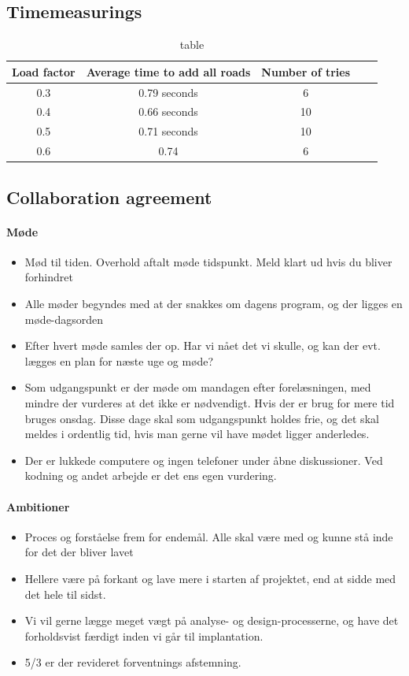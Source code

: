 \documentclass[a4paper,10pt,titlepage]{article}
\begin{document}
	\newpage

	\subsection{Timemeasurings}
		\begin{table}[H]
		\caption{table}
		\centering
		\begin{tabular}{c c c c c}
Load factor & Average time to add all roads & Number of tries \\ [1.5ex] 
\hline
0.3 & 0.79 seconds & 6\\
0.4 & 0.66 seconds & 10 \\
0.5 & 0.71 seconds & 10 \\
0.6 & 0.74 & 6
\end{tabular}
\end{table}

	\newpage
	\subsection{Collaboration agreement}

\paragraph{M\o de} 
\begin{itemize}
\item Mød til tiden. Overhold aftalt møde tidspunkt. Meld klart ud hvis du bliver forhindret
\item Alle møder begyndes med at der snakkes om dagens program, og der ligges en møde-dagsorden
\item Efter hvert møde samles der op. Har vi nået det vi skulle, og kan der evt. lægges en plan for næste uge og møde?
\item Som udgangspunkt er der møde om mandagen efter forelæsningen, med mindre der vurderes at det ikke er nødvendigt. Hvis der er brug for mere tid bruges onsdag. Disse dage skal som udgangspunkt holdes frie, og det skal meldes i ordentlig tid, hvis man gerne vil have mødet ligger anderledes.
\item Der er lukkede computere og ingen telefoner under åbne diskussioner. Ved kodning og andet arbejde er det ens egen vurdering.
\end{itemize}

\paragraph{Ambitioner}
\begin{itemize}
\item Proces og forståelse frem for endemål. Alle skal være med og kunne stå inde for det der bliver lavet
\item Hellere være på forkant og lave mere i starten af projektet, end at sidde med det hele til sidst.
\item Vi vil gerne lægge meget vægt på analyse- og design-processerne, og have det forholdsvist færdigt inden vi går til implantation.
\item 5/3 er der revideret forventnings afstemning.
\end{itemize}
	\newpage
\end{document}
